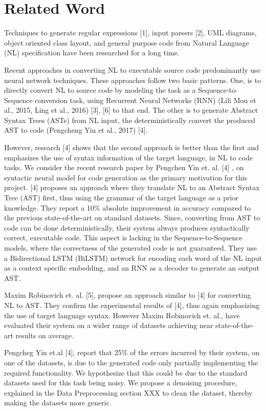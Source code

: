 \documentclass{IEEEtran}
\begin{document}
    \section{Related Word}
    Techniques to generate regular expressions [1], input parsers
    [2], UML diagrams, object oriented class layout, and general
    purpose code from Natural Language (NL) specification have
    been researched for a long time.

    Recent approaches in converting NL to executable source
    code predominantly use neural network techniques. These approaches follow two basic patterns. 
    One, is to directly convert
    NL to source code by modeling the task as a Sequence-to-Sequence conversion task, 
    using Recurrent Neural Networks
    (RNN) (Lili Mou et al., 2015, Ling et al., 2016) [3], [6] to that end.
    The other is to generate Abstract Syntax Trees (ASTs) from NL input, the deterministically
    convert the produced AST to code (Pengcheng Yin et al., 2017) [4].

    However, research [4] shows that the second approach is better
    than the first and emphasizes the use of syntax information of
    the target language, in NL to code tasks.
    We consider the recent research paper by Pengchen Yin
    et. al. [4] , on syntactic neural model for code generation
    as the primary motivation for this project. [4] proposes an
    approach where they translate NL to an Abstract Syntax Tree
    (AST) first, thus using the grammar of the target language
    as a prior knowledge. They report a 10\% absolute improvement in accuracy compared to 
    the previous state-of-the-art
    on standard datasets. Since, converting from AST to code
    can be done deterministically, their system always produces
    syntactically correct, executable code. This aspect is lacking
    in the Sequence-to-Sequence models, where the correctness of
    the generated code is not guaranteed. They use a Bidirectional
    LSTM (BiLSTM) network for encoding each word of the NL input as
    a context specific embedding, and an RNN as a decoder to
    generate an output AST.

    Maxim Robinovich et. al. [5], propose an approach similar
    to [4] for converting NL to AST. They confirm the experimental results of [4], thus again 
    emphasizing the use of target
    language syntax. However Maxim Robinovich et. al., have
    evaluated their system on a wider range of datasets achieving
    near state-of-the-art results on average.

    Pengcheg Yin et.al [4], report that 25\% of the errors incurred
    by their system, on one of the datasets, is due to the generated
    code only partially implementing the required functionality.
    We hypothesize that this could be due to the standard datasets
    used for this task being noisy. We propose a denoising procedure,
    explained in the Data Preprocessing section XXX to clean the dataset,
    thereby making the datasets more generic.
\end{document}
